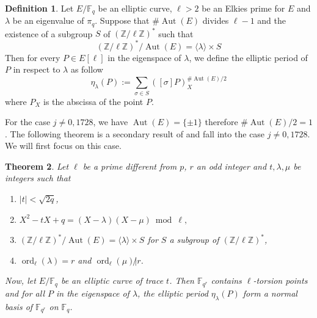 \documentclass[12pt]{article}
\theoremstyle{plain}
\newtheorem{theorem}{Theorem}
\theoremstyle{definition}
\newtheorem{definition}[theorem]{Definition}
\DeclareMathOperator{\order}{ord} %
\DeclareMathOperator{\Aut}{Aut}
\def\Z{\ensuremath{\mathbb{Z}}}
\def\F{\ensuremath{\mathbb{F}}}
\begin{document}
\begin{definition}
\label{definition:ellperiod}
Let $E/\F_q$ be an elliptic curve, $\ell>2$ be an Elkies prime for $E$ and 
$\lambda$ be an eigenvalue of $\pi_q$. Suppose that $\#\Aut(E)$ divides $\ell -
1$ and the existence of a subgroup $S$ of $(\Z/\ell\Z)^{\ast}$ such that 
\begin{equation}
(\Z/\ell\Z)^{\ast}/\Aut(E)=\langle{\lambda}\rangle\times S
\end{equation}
Then for every $P\in E[\ell]$ in the eigenspace of $\lambda$, we define the
elliptic period of $P$ in respect to $\lambda$ as follow
\begin{equation}
\eta_{\lambda}(P) := \sum_{\sigma\in S}{\left([\sigma]P\right)_X^{\#\Aut(E)/2}}
\end{equation}
where $P_X$ is the abscissa of the point $P$.

\end{definition}

For the case $j\neq0,1728$, we have $\Aut(E)=\lbrace{\pm1}\rbrace$ therefore
$\#\Aut(E)/2 = 1$. The following theorem is a secondary result of
\cite{MiMoScho} and fall into the case $j\neq0,1728$. We will first focus on
this case.

\begin{theorem}
\label{theorem:ellperiods}
Let $\ell$ be a prime different from $p$, $r$ an odd integer and $t, \lambda,
\mu$ be integers such that 
\begin{enumerate}
    \item $\mid t\mid < \sqrt{2q}$,
    \item $X^2 - tX + q = (X - \lambda)(X - \mu)\bmod \ell,$
    \item $(\Z/\ell\Z)^{\ast}/\Aut(E) = \langle{\lambda}\rangle \times S$ for $S$ a subgroup of
$(\Z/\ell\Z)^{\ast}$,
    \item $\order_\ell(\lambda) = r$ and $\order_\ell(\mu)\not|r$.
\end{enumerate}
Now, let $E/\F_q$ be an elliptic curve of trace $t$. Then $\F_{q^r}$ contains 
$\ell$-torsion points and for all $P$ in the eigenspace of $\lambda$, the elliptic 
period $\eta_\lambda(P)$ form a normal basis of $\F_{q^r}$ on $\F_q$.
\end{theorem}
\end{document}
